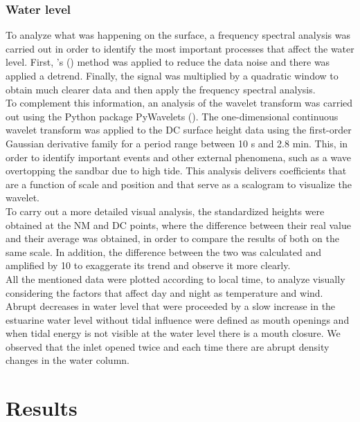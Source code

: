 \documentclass[11pt,letterpaper]{article}
\begin{document}
\subsubsection{Water level}

To analyze what was happening on the surface, a frequency spectral analysis was carried out in order to identify the most important processes that affect the water level. First, \citeauthor{welch1967use}'s (\cite*{welch1967use}) method was applied to reduce the data noise and there was applied a detrend. Finally, the signal was multiplied by a quadratic window to obtain much clearer data and then apply the frequency spectral analysis. \\

To complement this information, an analysis of the wavelet transform was carried out using the Python package PyWavelets (\cite{lee2019pywavelets}). The one-dimensional continuous wavelet transform was applied to the DC surface height data using the first-order Gaussian derivative family for a period range between 10 s and 2.8 min. This, in order to identify important events and other external phenomena, such as a wave overtopping the sandbar due to high tide. This analysis delivers coefficients that are a function of scale and position and that serve as a scalogram to visualize the wavelet.\\

To carry out a more detailed visual analysis, the standardized heights were obtained at the NM and DC points, where the difference between their real value and their average was obtained, in order to compare the results of both on the same scale. In addition, the difference between the two was calculated and amplified by 10 to exaggerate its trend and observe it more clearly.\\

All the mentioned data were plotted according to local time, to analyze visually considering the factors that affect day and night as temperature and wind. Abrupt decreases in water level that were proceeded by a slow increase in the estuarine water level without tidal influence were defined as mouth openings and when tidal energy is not visible at the water level there is a mouth closure. We observed that the inlet opened twice and each time there are abrupt density changes in the water column.  

\section{Results}
\end{document}
